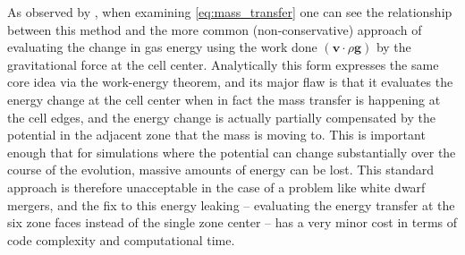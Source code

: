 \documentclass[iop]{../emulateapj}
\begin{document}
As observed by \cite{arepo}, when examining \autoref{eq:mass_transfer} one can see the relationship 
between this method and the more common (non-conservative) approach of evaluating the change in 
gas energy using the work done $(\mathbf{v} \cdot \rho \mathbf{g})$ by the gravitational force at the 
cell center. Analytically this form expresses the same core idea via the work-energy theorem, and its 
major flaw is that it evaluates the energy change at the cell center when in fact the mass transfer is 
happening at the cell edges, and the energy change is actually partially compensated by the potential 
in the adjacent zone that the mass is moving to. This is important enough that for simulations where the 
potential can change substantially over the course of the evolution, massive amounts of energy can be lost. 
This standard approach is therefore unacceptable in the case of a problem like white dwarf mergers, and 
the fix to this energy leaking -- evaluating the energy transfer at the six zone faces instead of 
the single zone center -- has a very minor cost in terms of code complexity and computational time.
\end{document}
